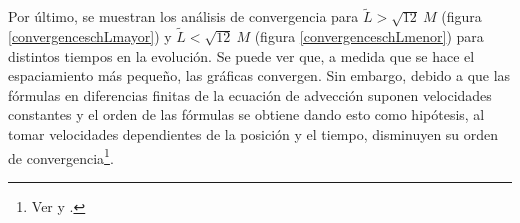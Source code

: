 \documentclass[11pt,twoside,openright,spanish]{report}
\numberwithin{equation}{chapter}
\numberwithin{figure}{chapter}
\numberwithin{table}{chapter}
\begin{document}
Por último, se muestran los análisis de convergencia para $\tilde{L}>\sqrt{12}\ M$ (figura \ref{convergenceschLmayor}) y $\tilde{L}<\sqrt{12}\ M$ (figura \ref{convergenceschLmenor}) para distintos tiempos en la evolución. Se puede ver que, a medida que se hace el espaciamiento más pequeño, las gráficas convergen. Sin embargo, debido a que las fórmulas en diferencias finitas de la ecuación de advección suponen velocidades constantes y el orden de las fórmulas se obtiene dando esto como hipótesis, al tomar velocidades dependientes de la posición y el tiempo, disminuyen su orden de convergencia\footnote{Ver \citet{Thomas1998} y \citet{schullenfdmfaivvf}.}.
 
\begin{table}[t]
	\centering
	\caption{Cantidades utilizadas para las simulaciones en coordenadas de Schwarzschild, con distintos momentos angulares.}\label{datossch}
\end{table}
\end{document}
